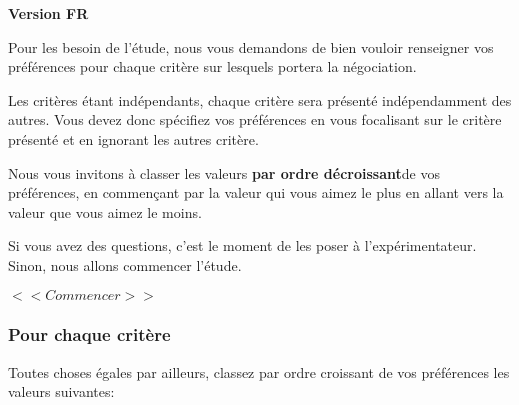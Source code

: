 \documentclass [french]{paper}
\begin{document}
					\textbf{Version FR}
					
					
					Pour les besoin de l'étude, nous vous demandons de bien vouloir renseigner vos préférences pour chaque critère sur lesquels portera la négociation.
					
					Les critères étant indépendants, chaque critère sera présenté indépendamment des autres. Vous devez donc spécifiez vos préférences en vous focalisant sur le critère présenté et en ignorant les autres critère.
					
					Nous vous invitons à classer les valeurs \textbf{par ordre décroissant}de vos préférences, en commençant par la valeur qui vous aimez le plus en allant vers la valeur que vous aimez le moins.
					
					Si vous avez des questions, c'est le moment de les poser à l'expérimentateur. Sinon, nous allons commencer l'étude.
					
					$<<Commencer>>$
					
					
					\subsubsection{Pour chaque critère}
					Toutes choses égales par ailleurs, classez par ordre croissant de vos préférences les valeurs suivantes: 
					
	
\end{document}
